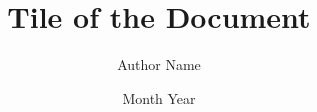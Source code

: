 \documentclass[phd,thesis,twoside]{iist}
\title{Tile of the Document}
\author{Author Name}
\date{Month Year}
\begin{document}
\maketitle %
\makecertificate %
\makedeclaration %
\makededication %
\makeacknowledgements %
\makeabstract %
\maketableofcontents %
\makelistoffigures %
\makelistoftables %
\makelistofalgorithms %
\makeabbreviations %
\makenomenclature %

\makechaptersettings 







\makebibsettings



\makepublications

\makeappendixsettings



\makeindexsettings
\end{document}
